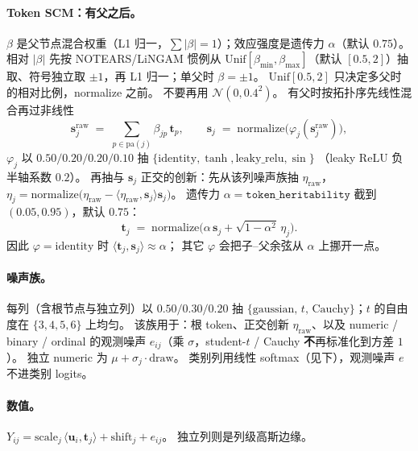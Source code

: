 \documentclass[11pt,a4paper,fontset=none]{ctexart}
\newcommand{\uu}{\mathbf{u}}
\begin{document}
\paragraph{Token SCM：有父之后。}
$\beta$ 是父节点混合权重（L1 归一，$\sum|\beta|=1$）；效应强度是遗传力 $\alpha$（默认 $0.75$）。
相对 $|\beta|$ 先按 NOTEARS/LiNGAM 惯例从 $\mathrm{Unif}[\beta_{\min},\beta_{\max}]$（默认 $[0.5,2]$）抽取、符号独立取 $\pm 1$，再 L1 归一；单父时 $\beta=\pm 1$。
$\mathrm{Unif}[0.5,2]$ 只决定多父时的相对比例，normalize 之前。
不要再用 $\mathcal{N}(0,0.4^2)$。
有父时按拓扑序先线性混合再过非线性
\begin{equation}
  \mathbf{s}^{\mathrm{raw}}_j \;=\; \sum_{p\in\mathrm{pa}(j)}\beta_{jp}\,\mathbf{t}_p,\qquad
  \mathbf{s}_j \;=\; \mathrm{normalize}\bigl(\varphi_j(\mathbf{s}^{\mathrm{raw}}_j)\bigr),
\end{equation}
$\varphi_j$ 以 $0.50/0.20/0.20/0.10$ 抽
$\{\mathrm{identity},\tanh,\mathrm{leaky\_relu},\sin\}$
（leaky ReLU 负半轴系数 $0.2$）。
再抽与 $\mathbf{s}_j$ 正交的创新：先从该列噪声族抽 $\eta_{\mathrm{raw}}$，
$\eta_j=\mathrm{normalize}\bigl(\eta_{\mathrm{raw}}-\langle\eta_{\mathrm{raw}},\mathbf{s}_j\rangle\mathbf{s}_j\bigr)$。
遗传力 $\alpha=\texttt{token\_heritability}$ 截到 $(0.05,0.95)$，默认 $0.75$：
\begin{equation}
  \mathbf{t}_j \;=\; \mathrm{normalize}\bigl(\alpha\,\mathbf{s}_j + \sqrt{1-\alpha^2}\,\eta_j\bigr).
\end{equation}
因此 $\varphi=\mathrm{identity}$ 时 $\langle\mathbf{t}_j,\mathbf{s}_j\rangle\approx\alpha$；
其它 $\varphi$ 会把子--父余弦从 $\alpha$ 上挪开一点。

\paragraph{噪声族。}
每列（含根节点与独立列）以 $0.50/0.30/0.20$ 抽
$\{\mathrm{gaussian},\,t,\,\mathrm{Cauchy}\}$；$t$ 的自由度在 $\{3,4,5,6\}$ 上均匀。
该族用于：根 token、正交创新 $\eta_{\mathrm{raw}}$、以及 numeric / binary / ordinal
的观测噪声 $e_{ij}$（乘 $\sigma$，student-$t$ / Cauchy \textbf{不}再标准化到方差 $1$）。
独立 numeric 为 $\mu + \sigma_j\cdot\mathrm{draw}$。
类别列用线性 softmax（见下），观测噪声 $e$ 不进类别 logits。

\paragraph{数值。}
$Y_{ij}=\mathrm{scale}_j\,\langle \uu_i,\mathbf{t}_j\rangle+\mathrm{shift}_j+e_{ij}$。
独立列则是列级高斯边缘。
\end{document}
